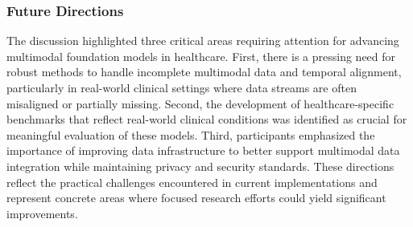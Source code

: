 \subsubsection{Future Directions}
The discussion highlighted three critical areas requiring attention for advancing multimodal foundation models in healthcare. First, there is a pressing need for robust methods to handle incomplete multimodal data and temporal alignment, particularly in real-world clinical settings where data streams are often misaligned or partially missing. Second, the development of healthcare-specific benchmarks that reflect real-world clinical conditions was identified as crucial for meaningful evaluation of these models. Third, participants emphasized the importance of improving data infrastructure to better support multimodal data integration while maintaining privacy and security standards. These directions reflect the practical challenges encountered in current implementations and represent concrete areas where focused research efforts could yield significant improvements.